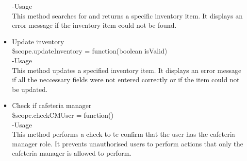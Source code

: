 \documentclass[a4paper,12pt]{article}
\begin{document}
\begin{itemize}
     -Usage\\
     This method searches for and returns a specific inventory item. It displays an error message if the inventory item could not be found.
     \item Update inventory\\
      \$scope.updateInventory = function(boolean isValid)\\
      -Usage\\
      This method updates a specified inventory item. It displays an error message if all the neccessary fields were not entered correctly or if the item could not be updated.
      \item Check if cafeteria manager\\
       \$scope.checkCMUser = function()\\
       -Usage\\
       This method performs a check to te confirm that the user has the cafeteria manager role. It prevents unauthorised users to perform actions that only the cafeteria manager is allowed to perform.
       
 \end{itemize}
 
\end{document}
